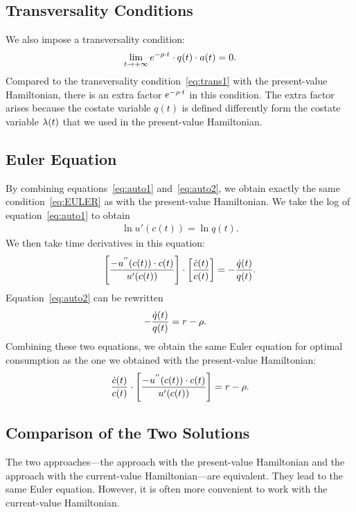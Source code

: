 \documentclass[letterpaper,12pt,leqno]{article}
\begin{document}
\subsection{Transversality Conditions}

We also impose a transversality condition:
\[\lim_{t\to+\infty}e^{-\rho \cdot t} \cdot  q(t)\cdot a(t)=0.\]
Compared to the transversality condition~\eqref{eq:trans1} with the present-value Hamiltonian, there is an extra factor $e^{-\rho \cdot t}$ in this condition. The extra factor arises because the costate variable $q(t)$ is defined differently form the costate variable $\lambda(t)$ that we used in the present-value Hamiltonian.

\subsection{Euler Equation}

By combining equations~\eqref{eq:auto1} and~\eqref{eq:auto2}, we obtain exactly the same condition~\eqref{eq:EULER} as with the present-value Hamiltonian. We take the log of equation~\eqref{eq:auto1} to obtain
\begin{align*}
\ln{u'(c(t))} = \ln{q(t)}.
\end{align*}
We then take time derivatives in this equation:
\begin{equation*}
\left[  \frac{-u^{''}(c(t)) \cdot c(t)}{u'(c(t))} \right]\cdot \left[ \frac{\dot{c}(t)}{c(t)} \right] =-\frac{\dot{q}(t)}{q(t)}.
\end{equation*}
Equation~\eqref{eq:auto2} can be rewritten
\begin{align*}
-\frac{\dot{q}(t)}{q(t)}&= r-\rho.
\end{align*}
Combining these two equations, we obtain the same Euler equation for optimal consumption as the one we obtained with the present-value Hamiltonian:
\begin{equation*}
\frac{\dot{c}(t)}{c(t)}\cdot \left[ \frac{-u^{''}(c(t)) \cdot c(t)}{u'(c(t)) } \right] =r-\rho.
\end{equation*}

\subsection{Comparison of the Two Solutions}

The two approaches---the approach with the present-value Hamiltonian and the approach with the current-value Hamiltonian---are equivalent. They lead to the same Euler equation. However, it is often more convenient to work with the current-value Hamiltonian.
\end{document}
